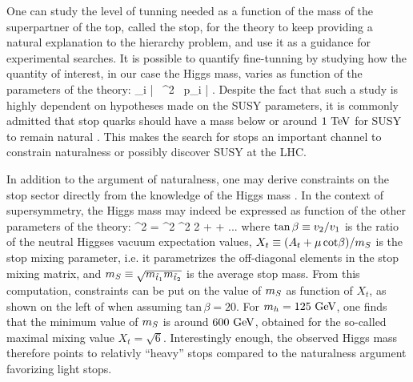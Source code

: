         One can study the level of tunning needed as a function of the mass of the superpartner
        of the top, called the stop, for the theory to keep providing a natural explanation to the hierarchy
        problem, and use it as a guidance for experimental searches. It is possible to quantify
        fine-tunning by studying how the quantity of interest, in our case the Higgs mass,
        varies as function of the parameters of the theory:
        \eq{}
        {
            \Delta {}
            _i
            \left|
                 \frac
                 {\partial {}\, ^2}
                 {\partial {}\, p_i}
            \right|
        }.
        Despite the fact that such a study is highly dependent on hypotheses made on the SUSY parameters,
        it is commonly admitted that stop quarks should have a mass below or around $1~\text{TeV}$
        for SUSY to remain natural \cite{TheMoreMinimalSSM, NaturalSusyEndures, ANaturalSUSYHiggs}. This makes the search for
        stops an important channel to constrain naturalness or possibly discover SUSY
        at the LHC.

        In addition to the argument of naturalness, one may derive constraints on the stop
        sector directly from the knowledge of the Higgs mass \cite{TheLightStopWindow}. In
        the context of supersymmetry, the Higgs mass may indeed be expressed as function
        of the other parameters of the theory:
        {
            ^2
            =
            ^2 ^2 2\beta
            +
            + ...
        }
        where $\text{tan}\, \beta \equiv v_2/v_1$ is the ratio of the neutral
        Higgses vacuum expectation values,
        $X_t \equiv (A_t + \mu\, \text{cot} \beta) / m_{S}$ is the stop mixing
        parameter, i.e. it parametrizes the off-diagonal elements in the stop mixing
        matrix, and $m_{S} \equiv \sqrt{m_{\tilde{t}_1}m_{\tilde{t}_2}}$ is the average stop
        mass. From this computation, constraints can be put on the value of $m_{S}$ as
        function of $X_t$, as shown on the left of  when assuming $\text{tan}\, \beta
        = 20$. For $m_{h}= 125~\text{GeV}$, one finds that the minimum value of $m_{S}$ is
        around $600~\text{GeV}$, obtained for the so-called maximal mixing value $X_t = \sqrt{6}$.
        Interestingly enough, the observed Higgs mass therefore points to relativly ``heavy''
        stops compared to the naturalness argument favorizing light stops.

